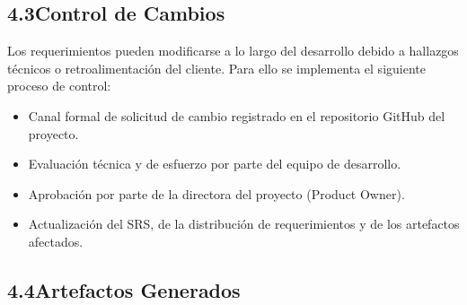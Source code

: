 \documentclass[12pt, letterpaper]{article}
\begin{document}
\subsection*{4.3\quad Control de Cambios}

Los requerimientos pueden modificarse a lo largo del desarrollo debido a hallazgos técnicos
o retroalimentación del cliente. Para ello se implementa el siguiente proceso de control:

\begin{itemize}[leftmargin=1.5em,itemsep=4pt]
  \item Canal formal de solicitud de cambio registrado en el repositorio GitHub del
        proyecto.
  \item Evaluación técnica y de esfuerzo por parte del equipo de desarrollo.
  \item Aprobación por parte de la directora del proyecto (Product Owner).
  \item Actualización del SRS, de la distribución de requerimientos y de los
        artefactos afectados.
\end{itemize}

\subsection*{4.4\quad Artefactos Generados}
\end{document}
